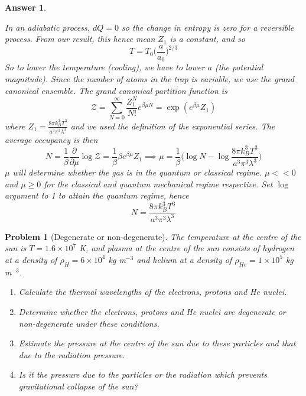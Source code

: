 \documentclass[a4paper]{article}
\newtheorem{ans}{Answer}[section]
\theoremstyle{new}
\newtheorem{qns}{Problem}[section]
\begin{document}
\begin{ans}
\begin{center}
\end{center}
In an adiabatic process, $dQ=0$ so the change in entropy is zero for a reversible process. From our result, this hence mean $Z_1$ is a constant, and so
$$T=T_0\bigg(\frac{a}{a_0}\bigg)^{2/3}$$
So to lower the temperature (cooling), we have to lower $a$ (the potential magnitude). Since the number of atoms in the trap is variable, we use the grand canonical ensemble. The grand canonical partition function is
$$\mathcal{Z}=\sum_{N=0}^\infty\frac{Z_1^N}{N!}e^{\beta\mu N}=\exp(e^{\beta\mu}Z_1)$$
where $Z_1=\frac{8\pi k_B^3T^3}{a^3\pi^3\lambda^3}$ and we used the definition of the exponential series. The average occupancy is then
$$N=\frac{1}{\beta}\frac{\partial}{\partial\mu}\log\mathcal{Z}=\frac{1}{\beta}\beta e^{\beta\mu}Z_1\implies \mu=\frac{1}{\beta}\bigg(\log N-\log\frac{8\pi k_B^3T^3}{a^3\pi^3\lambda^3}\bigg)$$
$\mu$ will determine whether the gas is in the quantum or classical regime. $\mu<<0$ and $\mu\geq0$ for the classical and quantum mechanical regime respective. Set $\log$ argument to 1 to attain the quantum regime, hence
$$N=\frac{8\pi k_B^3T^3}{a^3\pi^3\lambda^3}$$
\end{ans}
\begin{qns}[Degenerate or non-degenerate]
The temperature at the centre of the sun is $T = 1.6\times 10^7$ K, and plasma at the centre of the sun consists of hydrogen at a density of $\rho_H = 6\times10^4$ kg m$^{−3}$ and helium at a density of $\rho_{He} = 1\times10^5$ kg m$^{−3}$.
\begin{enumerate}[label=(\alph*)]
\item Calculate the thermal wavelengths of the electrons, protons and He nuclei.
\item Determine whether the electrons, protons and He nuclei are degenerate or non-degenerate under these conditions.
\item Estimate the pressure at the centre of the sun due to these particles and that due to the radiation pressure.
\item Is it the pressure due to the particles or the radiation which prevents gravitational collapse of the sun?
\end{enumerate}
\end{qns}
\end{document}

